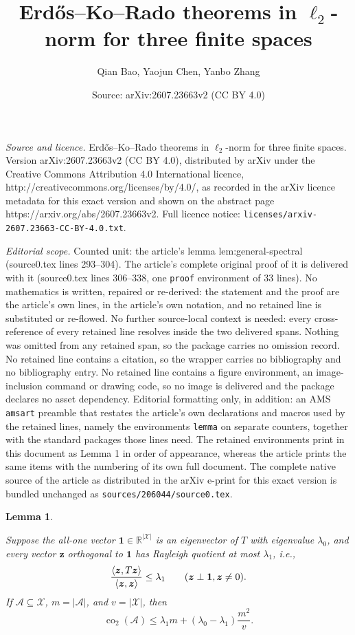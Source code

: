 \documentclass[10pt,a4paper]{amsart}
\title{Erd\H{o}s--Ko--Rado theorems in $\ell_2$-norm for three finite spaces}
\author{Qian Bao, Yaojun Chen, Yanbo Zhang}
\date{Source: arXiv:2607.23663v2 (CC BY 4.0)}
\newtheorem{lemma}{Lemma}
\newcommand{\co}{\operatorname{co}_2}
\begin{document}
\maketitle

\noindent\emph{Source and licence.} Erd\H{o}s--Ko--Rado theorems in $\ell_2$-norm for three finite spaces. Version arXiv:2607.23663v2 (CC BY 4.0), distributed by arXiv under the Creative Commons Attribution 4.0 International licence, http://creativecommons.org/licenses/by/4.0/, as recorded in the arXiv licence metadata for this exact version and shown on the abstract page https://arxiv.org/abs/2607.23663v2. Full licence notice: \texttt{licenses/arxiv-2607.23663-CC-BY-4.0.txt}.\par\smallskip

\noindent\textit{Editorial scope.} Counted unit: the article's lemma lem:general-spectral (source0.tex lines 293--304). The article's complete original proof of it is delivered with it (source0.tex lines 306--338, one \texttt{proof} environment of 33 lines). No mathematics is written, repaired or re-derived: the statement and the proof are the article's own lines, in the article's own notation, and no retained line is substituted or re-flowed.  No further source-local context is needed: every cross-reference of every retained line resolves inside the two delivered spans.  Nothing was omitted from any retained span, so the package carries no omission record.  No retained line contains a citation, so the wrapper carries no bibliography and no bibliography entry.  No retained line contains a figure environment, an image-inclusion command or drawing code, so no image is delivered and the package declares no asset dependency.  Editorial formatting only, in addition: an AMS \texttt{amsart} preamble that restates the article's own declarations and macros used by the retained lines, namely the environments \texttt{lemma} on separate counters, together with the standard packages those lines need.  The retained environments print in this document as Lemma 1 in order of appearance, whereas the article prints the same items with the numbering of its own full document.  The complete native source of the article as distributed in the arXiv e-print for this exact version is bundled unchanged as \texttt{sources/206044/source0.tex}.
\begin{lemma}\label{lem:general-spectral}

Suppose the all-one vector $\mathbf 1\in\mathbb R^{|\mathscr{X}|}$ is an eigenvector of $T$ with eigenvalue $\lambda_0$, and every vector $\bm{z}$ orthogonal to $\mathbf 1$ has Rayleigh quotient at most $\lambda_1$, i.e.,
\[
\frac{\langle \bm{z},T\bm{z}\rangle}{\langle \bm{z},\bm{z}\rangle}\le \lambda_1
\qquad(\bm{z}\perp \mathbf 1,\\ \bm{z}\ne 0).
\]
If $\mathcal A\subseteq \mathscr{X}$, $m=|\mathcal A|$, and $v=|\mathscr{X}|$, then
\[
\co(\mathcal A)\le \lambda_1m+(\lambda_0-\lambda_1)\frac{m^2}{v}.
\]
\end{lemma}
\end{document}
